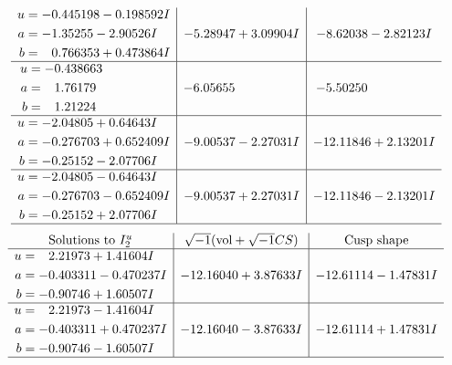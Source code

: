 \documentclass[1p]{elsarticle_modified}
\theoremstyle{definition}
\newcommand{\I}{\sqrt{-1}}
\begin{document}
$$\begin{array}{c|c|c}
\begin{aligned}
u &= -0.445198 - 0.198592 I \\
a &= -1.35255 - 2.90526 I \\
b &= \phantom{-}0.766353 + 0.473864 I\end{aligned}
 & -5.28947 + 3.09904 I & -8.62038 - 2.82123 I \\ \hline\begin{aligned}
u &= -0.438663\phantom{ +0.000000I} \\
a &= \phantom{-}1.76179\phantom{ +0.000000I} \\
b &= \phantom{-}1.21224\phantom{ +0.000000I}\end{aligned}
 & -6.05655\phantom{ +0.000000I} & -5.50250\phantom{ +0.000000I} \\ \hline\begin{aligned}
u &= -2.04805 + 0.64643 I \\
a &= -0.276703 + 0.652409 I \\
b &= -0.25152 - 2.07706 I\end{aligned}
 & -9.00537 - 2.27031 I & -12.11846 + 2.13201 I \\ \hline\begin{aligned}
u &= -2.04805 - 0.64643 I \\
a &= -0.276703 - 0.652409 I \\
b &= -0.25152 + 2.07706 I\end{aligned}
 & -9.00537 + 2.27031 I & -12.11846 - 2.13201 I\\
 \hline 
 \end{array}$$\newpage$$\begin{array}{c|c|c}  
\text{Solutions to }I^u_{2}& \I (\text{vol} + \sqrt{-1}CS) & \text{Cusp shape}\\
 \hline 
\begin{aligned}
u &= \phantom{-}2.21973 + 1.41604 I \\
a &= -0.403311 - 0.470237 I \\
b &= -0.90746 + 1.60507 I\end{aligned}
 & -12.16040 + 3.87633 I & -12.61114 - 1.47831 I \\ \hline\begin{aligned}
u &= \phantom{-}2.21973 - 1.41604 I \\
a &= -0.403311 + 0.470237 I \\
b &= -0.90746 - 1.60507 I\end{aligned}
 & -12.16040 - 3.87633 I & -12.61114 + 1.47831 I\\
 \hline 
 \end{array}$$\newpage
\newpage\renewcommand{\arraystretch}{1}
\end{document}
